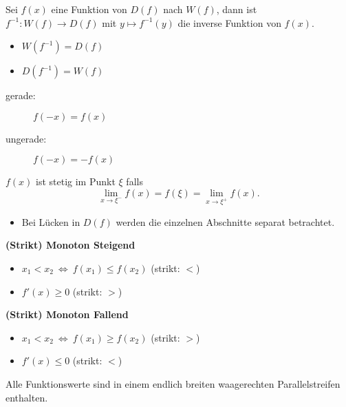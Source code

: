         Sei $f(x)$ eine Funktion von $D(f)$ nach $W(f)$, dann ist $f^{-1}: W(f) \to D(f)$ mit $y \mapsto f^{-1}(y)$ die inverse Funktion von $f(x)$.
        \begin{itemize}
            \item $W(f^{-1}) = D(f)$
            \item $D(f^{-1}) = W(f)$
        \end{itemize}
        \begin{description}
            \item[gerade:]\phantom{as} $f(-x) = f(x)$ 
            \item[ungerade:] $f(-x) = -f(x)$ 
        \end{description}
    \vspace{3pt}
    
        $f(x)$ ist stetig im Punkt $\xi$ falls
        $$
            \lim_{x\to\xi^-} f(x) = f(\xi) = \lim_{x\to\xi^+} f(x).
        $$
        \begin{itemize}
            \item Bei Lücken in $D(f)$ werden die einzelnen Abschnitte separat betrachtet.
        \end{itemize}
        
    \vspace{3pt}
    
        \textbf{(Strikt) Monoton Steigend}
            \begin{itemize}
                \item $x_1 < x_2\ \Longleftrightarrow\ f(x_1) \leq f(x_2)$ \hfill (strikt: $<$)
                \item $f'(x) \geq 0$ \hfill (strikt: $>$)
            \end{itemize}
        \textbf{(Strikt) Monoton Fallend}
            \begin{itemize}
                \item $x_1 < x_2\ \Longleftrightarrow\ f(x_1) \geq f(x_2)$ \hfill (strikt: $>$)
                \item $f'(x) \leq 0$ \hfill (strikt: $<$)
            \end{itemize}
    \vspace{3pt}
    
        Alle Funktionswerte sind in einem endlich breiten waagerechten Parallelstreifen enthalten.

